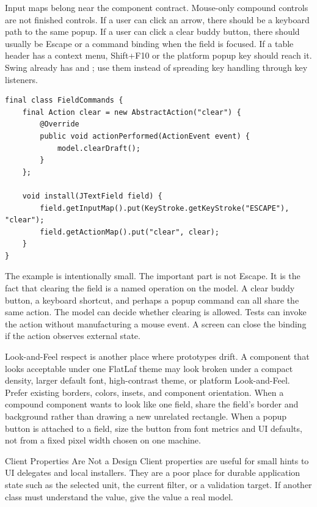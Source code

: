 Input maps belong near the component contract. Mouse-only compound controls are not
finished controls. If a user can click an arrow, there should be a keyboard path to the
same popup. If a user can click a clear buddy button, there should usually be Escape or
a command binding when the field is focused. If a table header has a context menu,
Shift+F10 or the platform popup key should reach it. Swing already has
 and ;
use them instead of spreading key handling through key listeners.

\begin{lstlisting}[caption={A compound control installs named actions, not key listeners.}]
final class FieldCommands {
    final Action clear = new AbstractAction("clear") {
        @Override
        public void actionPerformed(ActionEvent event) {
            model.clearDraft();
        }
    };

    void install(JTextField field) {
        field.getInputMap().put(KeyStroke.getKeyStroke("ESCAPE"), "clear");
        field.getActionMap().put("clear", clear);
    }
}
\end{lstlisting}

The example is intentionally small. The important part is not Escape. It is the fact
that clearing the field is a named operation on the model. A clear buddy button, a
keyboard shortcut, and perhaps a popup command can all share the same action. The model
can decide whether clearing is allowed. Tests can invoke the action without
manufacturing a mouse event. A screen can close the binding if the action observes
external state.

Look-and-Feel respect is another place where prototypes drift. A component that looks
acceptable under one FlatLaf theme may look broken under a compact density, larger
default font, high-contrast theme, or platform Look-and-Feel. Prefer existing borders,
colors, insets, and component orientation. When a compound component wants to look like
one field, share the field's border and background rather than drawing a new unrelated
rectangle. When a popup button is attached to a field, size the button from font metrics
and UI defaults, not from a fixed pixel width chosen on one machine.

\begin{detailbox}{Client Properties Are Not a Design}
Client properties are useful for small hints to UI delegates and local installers. They
are a poor place for durable application state such as the selected unit, the current
filter, or a validation target. If another class must understand the value, give the
value a real model.
\end{detailbox}


